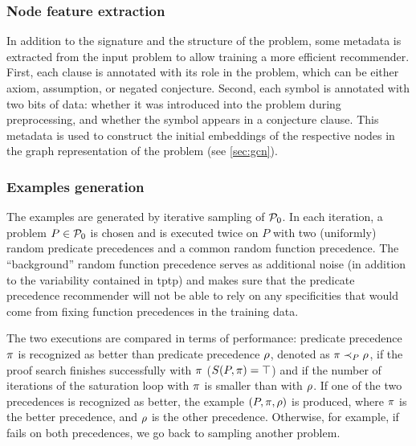 \subsubsection{Node feature extraction}

In addition to the signature and the structure of the problem,
some metadata is extracted from the input problem to allow training a more efficient recommender.
First, each clause is annotated with its role in the problem,
which can be either axiom, assumption, or negated conjecture.
Second, each symbol is annotated with two bits of data:
whether it was introduced into the problem during preprocessing,
and whether the symbol appears in a conjecture clause.
This metadata is used to construct the initial embeddings of the respective nodes
in the graph representation of the problem (see \cref{sec:gcn}).

\subsubsection{Examples generation}

The examples are generated by iterative sampling of $\operatorname{\mathcal{P}_{0}}$.
In each iteration, a problem $P \in \operatorname{\mathcal{P}_{0}}$ is chosen and \Vampire{} is executed twice on $P$
with two (uniformly) random predicate precedences and a common random function precedence.
The ``background'' random function precedence serves as additional noise (in addition to the variability 
contained in \gls{tptp}) and makes sure that the predicate precedence recommender
will not be able to rely on any specificities that would come from fixing function precedences in the training data.

The two executions are compared in terms of performance:
predicate precedence $\pi$ is recognized as better than predicate precedence $\rho$,
denoted as $\pi \prec_{P} \rho$,
if the proof search finishes successfully with $\pi$ ($S(P, \pi) = \top$)
and if the number of iterations of the saturation loop with $\pi$ is smaller than with $\rho$.
If one of the two precedences is recognized as better,
the example $(P, \pi, \rho)$ is produced,
where $\pi$ is the better precedence,
and $\rho$ is the other precedence.
Otherwise, for example, if \Vampire{} fails on both precedences, we go back to sampling another problem.

